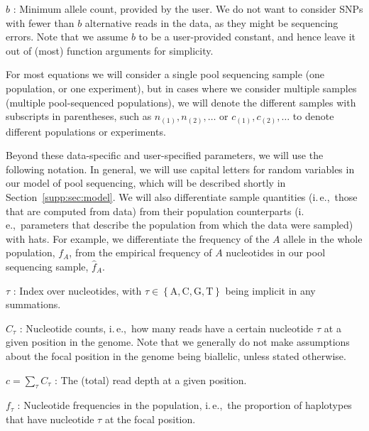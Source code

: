 \documentclass[letterpaper,fontsize=9pt,DIV=12]{scrartcl}
\newcommand\secref[1]{Section~\ref{#1}}
\newcommand{\samplesize}{n}
\newcommand{\readdepth}{c}
\newcommand{\empfreq}{\widehat{f}}
\newcommand{\ie}{i.\,e.,~}
\begin{document}


$b$ :
Minimum allele count, provided by the user.
We do not want to consider SNPs with fewer than $b$ alternative reads in the data, as they might be sequencing errors.
Note that we assume $b$ to be a user-provided constant,
and hence leave it out of (most) function arguments for simplicity.

For most equations we will consider a single pool sequencing sample (one population, or one experiment), but in cases where we consider multiple samples (multiple pool-sequenced populations), we will denote the different samples with subscripts in parentheses, such as $\samplesize_{(1)}, \samplesize_{(2)},\ldots$ or $\readdepth_{(1)}, \readdepth_{(2)}, \ldots$ to denote different populations or experiments.

Beyond these data-specific and user-specified parameters, we will use the following notation.  In general, we will use capital letters for random variables in our model of pool sequencing, which will be described shortly in \secref{supp:sec:model}.  We will also differentiate sample quantities (\ie those that are computed from data) from their population counterparts (\ie parameters that describe the population from which the data were sampled) with hats.  For example, we differentiate the frequency of the $A$ allele in the whole population, $f_A$, from the empirical frequency of $A$ nucleotides in our pool sequencing sample, $\empfreq_A$.

$\tau$ :
Index over nucleotides, with $\tau \in \left\{ \text{A}, \text{C}, \text{G}, \text{T} \right\}$ being implicit in any summations.

$C_\tau$ :
Nucleotide counts, \ie how many reads have a certain nucleotide $\tau$ at a given position in the genome. Note that we generally do not make assumptions about the focal position in the genome being biallelic, unless stated otherwise.

$\readdepth = \sum_\tau C_\tau$ : The (total) read depth at a given position.

$f_\tau$ :
Nucleotide frequencies in the population, \ie the proportion of haplotypes that have nucleotide $\tau$ at the focal position.
\end{document}
